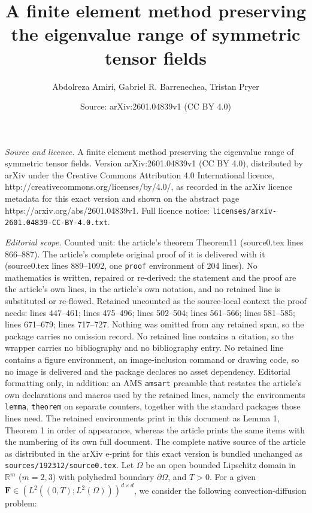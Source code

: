 \documentclass[10pt,a4paper]{amsart}
\title{A finite element method preserving the eigenvalue range of symmetric tensor fields}
\author{Abdolreza Amiri, Gabriel R. Barrenechea, Tristan Pryer}
\date{Source: arXiv:2601.04839v1 (CC BY 4.0)}
\begin{document}
\maketitle

\noindent\emph{Source and licence.} A finite element method preserving the eigenvalue range of symmetric tensor fields. Version arXiv:2601.04839v1 (CC BY 4.0), distributed by arXiv under the Creative Commons Attribution 4.0 International licence, http://creativecommons.org/licenses/by/4.0/, as recorded in the arXiv licence metadata for this exact version and shown on the abstract page https://arxiv.org/abs/2601.04839v1. Full licence notice: \texttt{licenses/arxiv-2601.04839-CC-BY-4.0.txt}.\par\smallskip

\noindent\textit{Editorial scope.} Counted unit: the article's theorem Theorem11 (source0.tex lines 866--887). The article's complete original proof of it is delivered with it (source0.tex lines 889--1092, one \texttt{proof} environment of 204 lines). No mathematics is written, repaired or re-derived: the statement and the proof are the article's own lines, in the article's own notation, and no retained line is substituted or re-flowed.  Retained uncounted as the source-local context the proof needs: lines 447--461; lines 475--496; lines 502--504; lines 561--566; lines 581--585; lines 671--679; lines 717--727.  Nothing was omitted from any retained span, so the package carries no omission record.  No retained line contains a citation, so the wrapper carries no bibliography and no bibliography entry.  No retained line contains a figure environment, an image-inclusion command or drawing code, so no image is delivered and the package declares no asset dependency.  Editorial formatting only, in addition: an AMS \texttt{amsart} preamble that restates the article's own declarations and macros used by the retained lines, namely the environments \texttt{lemma}, \texttt{theorem} on separate counters, together with the standard packages those lines need.  The retained environments print in this document as Lemma 1, Theorem 1 in order of appearance, whereas the article prints the same items with the numbering of its own full document.  The complete native source of the article as distributed in the arXiv e-print for this exact version is bundled unchanged as \texttt{sources/192312/source0.tex}.
Let $\Omega$ be an open bounded Lipschitz domain in $\mathbb{R}^{m}$ ($m=2,3$) with polyhedral boundary $\partial \Omega$, and $T>0$.
For a given $\mathbf{F}\in (L^{2}((0,T);L^{2}(\Omega)))^{d\times d}$, we consider the following convection-diffusion problem:
\end{document}
